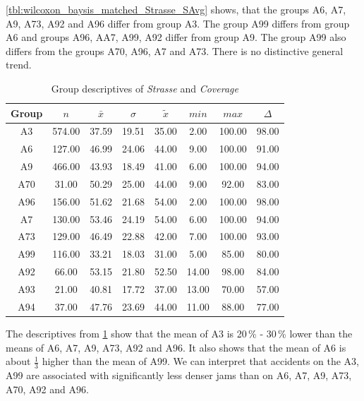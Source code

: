 \cref{tbl:wilcoxon_baysis_matched_Strasse_SAvg} shows, that the groups A6, A7, A9, A73, A92 and A96 differ from group A3. The group A99 differs from group A6 and groups A96, AA7, A99, A92 differ from group A9. The group A99 also differs from the groups A70, A96, A7 and A73. There is no distinctive general trend. 
\begin{table}[ht]
	\tiny
	\centering
	\begin{tabular}{c|c|c|c|c|c|c|c}
	  	\toprule
	 	Group & $n$ & $\bar{x}$ & $\sigma$ & $\tilde{x}$ & $min$ & $max$ & $\Delta$ \\   
	  	\midrule
		A3 & 574.00 & 37.59 & 19.51 & 35.00 & 2.00 & 100.00 & 98.00 \\ 
	  	A6 & 127.00 & 46.99 & 24.06 & 44.00 & 9.00 & 100.00 & 91.00 \\ 
	  	A9 & 466.00 & 43.93 & 18.49 & 41.00 & 6.00 & 100.00 & 94.00 \\ 
	  	A70 & 31.00 & 50.29 & 25.00 & 44.00 & 9.00 & 92.00 & 83.00 \\ 
	  	A96 & 156.00 & 51.62 & 21.68 & 54.00 & 2.00 & 100.00 & 98.00 \\ 
	  	A7 & 130.00 & 53.46 & 24.19 & 54.00 & 6.00 & 100.00 & 94.00 \\ 
	  	A73 & 129.00 & 46.49 & 22.88 & 42.00 & 7.00 & 100.00 & 93.00 \\ 
	  	A99 & 116.00 & 33.21 & 18.03 & 31.00 & 5.00 & 85.00 & 80.00 \\ 
	  	A92 & 66.00 & 53.15 & 21.80 & 52.50 & 14.00 & 98.00 & 84.00 \\ 
	  	A93 & 21.00 & 40.81 & 17.72 & 37.00 & 13.00 & 70.00 & 57.00 \\ 
	  	A94 & 37.00 & 47.76 & 23.69 & 44.00 & 11.00 & 88.00 & 77.00 \\ 
	  	\bottomrule
	\end{tabular}
	\caption{Group descriptives of \textit{Strasse} and \textit{Coverage}}
	\label{tbl:descriptives_baysis_matched_Strasse_Cov}
\end{table}
The descriptives from \cref{tbl:descriptives_baysis_matched_Strasse_Cov} show that the mean of A3 is 20\,\% - 30\,\% lower than the means of A6, A7, A9, A73, A92 and A96. It also shows that the mean of A6 is about $\frac{1}{3}$ higher than the mean of A99. We can interpret that accidents on the A3, A99 are associated with significantly less denser jams than on A6, A7, A9, A73, A70, A92 and A96.

